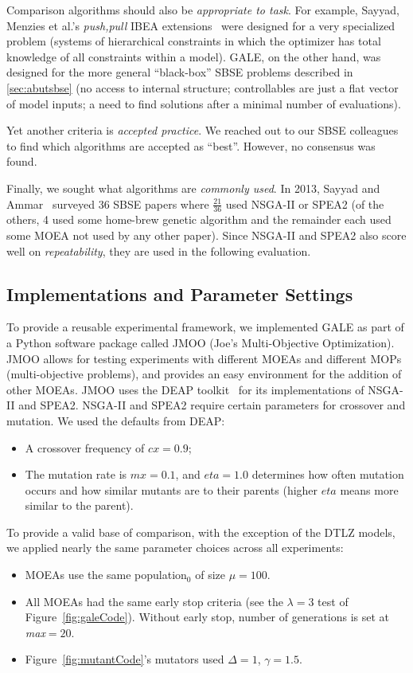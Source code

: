 \documentclass[10pt,journal,compsoc]{IEEEtran}
\newcommand{\bi}{\begin{itemize}}
\newcommand{\ei}{\end{itemize}}
\newcommand{\tion}[1]{\textsection\ref{sec:#1}}
\newcommand{\fig}[1]{Figure~\ref{fig:#1}}
\begin{document}
 

Comparison algorithms should also be {\em appropriate to task}.  
For example, Sayyad, Menzies et al.'s {\em push,pull} IBEA
extensions~\cite{sayyad13a,sayyad13b} were designed
for a very specialized problem (systems of
hierarchical constraints in which the optimizer has
total knowledge of all constraints within a model).
GALE, on the other hand, was designed for the more
general ``black-box'' SBSE problems described in
\tion{abutsbse} (no access to internal structure;
controllables are just a flat vector of model
inputs; a need to find solutions after a minimal
number of evaluations).

Yet another criteria is {\em accepted practice}. We reached out to our SBSE colleagues to
 find
which algorithms are accepted as ``best''.  However, no consensus was found.

Finally, we sought  what algorithms are {\em commonly used}.
In 2013, Sayyad and Ammar~\cite{sayyad13c} surveyed 36 SBSE papers where $\frac{21}{36}$
used NSGA-II or SPEA2 (of the others, 4 used some home-brew genetic algorithm and the remainder
each used some MOEA not used by any other paper). Since NSGA-II and SPEA2 
also score well on {\em repeatability},
they are used in the following evaluation.
 

\subsection{Implementations and Parameter Settings}\label{sec:expexp}
To provide a reusable experimental framework, we
implemented GALE as part of a Python software
package called JMOO (Joe's Multi-Objective
Optimization).  JMOO allows for
testing experiments with different MOEAs and
different MOPs (multi-objective problems), and
provides an easy environment for the addition of
other MOEAs.  
JMOO uses the DEAP
toolkit~\cite{jmlr12} for its
implementations of  NSGA-II and SPEA2.
NSGA-II and SPEA2 require certain
 parameters for crossover and
mutation. We used the defaults from  DEAP:
\bi
\item A crossover frequency of  $cx=0.9$;
\item The mutation rate is $mx=0.1$, and $eta=1.0$ determines how often
mutation occurs and how similar mutants are to their
parents (higher $eta$ means more similar to the
parent).
\ei

To provide a valid base of comparison, with the exception of the DTLZ models,
we applied nearly
the same parameter choices across all
experiments:
\bi
\item
MOEAs use the same
population$_0$ of size $\mu=100$.
\item All MOEAs had the same early stop criteria (see the
$\lambda=3$ test of \fig{galeCode}).
Without early stop, 
number of generations is set at {\em max}$=20$.
\item
\fig{mutantCode}'s mutators used \mbox{$\Delta=1$}, \mbox{$\gamma=1.5$}.
\ei
 
\end{document}
